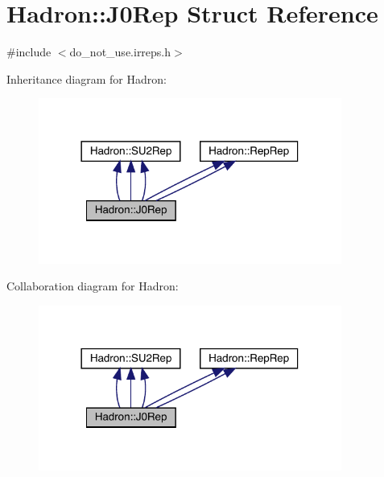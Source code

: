\hypertarget{structHadron_1_1J0Rep}{}\section{Hadron\+:\+:J0\+Rep Struct Reference}
\label{structHadron_1_1J0Rep}


{\ttfamily \#include $<$do\+\_\+not\+\_\+use.\+irreps.\+h$>$}



Inheritance diagram for Hadron\+:
\nopagebreak
\begin{figure}[H]
\begin{center}
\leavevmode
\includegraphics[width=282pt]{d1/dac/structHadron_1_1J0Rep__inherit__graph}
\end{center}
\end{figure}


Collaboration diagram for Hadron\+:
\nopagebreak
\begin{figure}[H]
\begin{center}
\leavevmode
\includegraphics[width=282pt]{df/d4c/structHadron_1_1J0Rep__coll__graph}
\end{center}
\end{figure}
